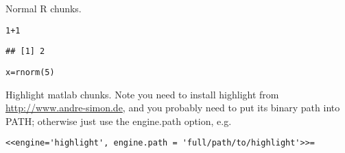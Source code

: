 \documentclass{article}\usepackage[]{graphicx}\usepackage[]{color}
\makeatletter
\newcommand{\hlnum}[1]{\textcolor[rgb]{0.863,0.196,0.184}{#1}}%
\newcommand{\hlopt}[1]{\textcolor[rgb]{0.576,0.631,0.631}{#1}}%
\newcommand{\hlstd}[1]{\textcolor[rgb]{0.514,0.58,0.588}{#1}}%
\newcommand{\hlkwb}[1]{\textcolor[rgb]{0.522,0.6,0}{#1}}%
\newcommand{\hlkwd}[1]{\textcolor[rgb]{0.576,0.631,0.631}{#1}}%
\newenvironment{kframe}{%
 \def\at@end@of@kframe{}%
 \ifinner\ifhmode%
  \def\at@end@of@kframe{\end{minipage}}%
  \begin{minipage}{\columnwidth}%
 \fi\fi%
 \def\FrameCommand##1{\hskip\@totalleftmargin \hskip-\fboxsep
 \colorbox{shadecolor}{##1}\hskip-\fboxsep
     \hskip-\linewidth \hskip-\@totalleftmargin \hskip\columnwidth}%
 \MakeFramed {\advance\hsize-\width
   \@totalleftmargin\z@ \linewidth\hsize
   \@setminipage}}%
 {\par\unskip\endMakeFramed%
 \at@end@of@kframe}
\newenvironment{knitrout}{}{} %
\makeatother
\begin{document}
Normal R chunks.

\begin{knitrout}
\color{fgcolor}\begin{kframe}
\begin{alltt}
\hlnum{1} \hlopt{+} \hlnum{1}
\end{alltt}
\begin{verbatim}
## [1] 2
\end{verbatim}
\begin{alltt}
\hlstd{x} \hlkwb{=} \hlkwd{rnorm}\hlstd{(}\hlnum{5}\hlstd{)}
\end{alltt}
\end{kframe}
\end{knitrout}

Highlight matlab chunks. Note you need to install highlight from \url{http://www.andre-simon.de}, and you probably need to put its binary path into PATH; otherwise just use the engine.path option, e.g.

\noindent\verb|<<engine='highlight', engine.path = 'full/path/to/highlight'>>=|
\end{document}
